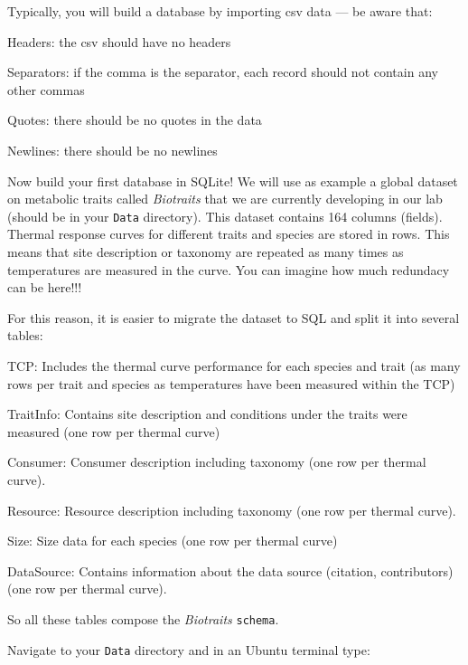 Typically, you will build a database by importing csv data --- be aware 
that:
    \begin{compactitem}
      \item Headers: the csv should have no headers
			\item Separators: if the comma is the separator, each record 
			should not contain any other commas
      \item Quotes: there should be no quotes in the data
      \item Newlines: there should be no newlines
    \end{compactitem}

		Now build your first database in SQLite! We will use as example a 
		global dataset on metabolic traits called {\it Biotraits} that we 
		are currently developing in our lab (should be in your {\tt Data} 
		directory). This dataset contains 164 columns (fields). Thermal 
		response curves for different traits and species are stored in 
		rows. This means that site description or taxonomy  are repeated as 
		many times as temperatures are measured in the curve. You can 
		imagine how much redundacy can be here!!!

		For this reason, it is easier to migrate the dataset to SQL and 
		split it into several tables:
    
    \begin{compactitem}
    \item TCP: Includes the thermal curve performance for each species and trait (as many rows per trait and species
      as temperatures have been measured within the TCP)
    \item TraitInfo: Contains site description and conditions under the traits were measured (one row per thermal curve)
    \item Consumer: Consumer description including taxonomy (one row per thermal curve).
    \item Resource: Resource description including taxonomy (one row per thermal curve).
    \item Size: Size data for each species (one row per thermal curve)
    \item DataSource: Contains information about the data source (citation, contributors) (one row per thermal curve).
    \end{compactitem}

    So all these tables compose the {\it Biotraits} {\tt schema}.

    Navigate to your {\tt Data} directory and in an Ubuntu terminal type:

